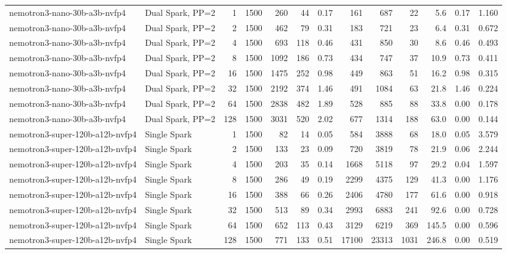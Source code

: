 \begin{tabular}{l l r r r r r r r r r r r}
nemotron3-nano-30b-a3b-nvfp4 & Dual Spark, PP=2 & 1 & 1500 & 260 & 44 & 0.17 & 161 & 687 & 22 & 5.6 & 0.17 & 1.160 \\
nemotron3-nano-30b-a3b-nvfp4 & Dual Spark, PP=2 & 2 & 1500 & 462 & 79 & 0.31 & 183 & 721 & 23 & 6.4 & 0.31 & 0.672 \\
nemotron3-nano-30b-a3b-nvfp4 & Dual Spark, PP=2 & 4 & 1500 & 693 & 118 & 0.46 & 431 & 850 & 30 & 8.6 & 0.46 & 0.493 \\
nemotron3-nano-30b-a3b-nvfp4 & Dual Spark, PP=2 & 8 & 1500 & 1092 & 186 & 0.73 & 434 & 747 & 37 & 10.9 & 0.73 & 0.411 \\
nemotron3-nano-30b-a3b-nvfp4 & Dual Spark, PP=2 & 16 & 1500 & 1475 & 252 & 0.98 & 449 & 863 & 51 & 16.2 & 0.98 & 0.315 \\
nemotron3-nano-30b-a3b-nvfp4 & Dual Spark, PP=2 & 32 & 1500 & 2192 & 374 & 1.46 & 491 & 1084 & 63 & 21.8 & 1.46 & 0.224 \\
nemotron3-nano-30b-a3b-nvfp4 & Dual Spark, PP=2 & 64 & 1500 & 2838 & 482 & 1.89 & 528 & 885 & 88 & 33.8 & 0.00 & 0.178 \\
nemotron3-nano-30b-a3b-nvfp4 & Dual Spark, PP=2 & 128 & 1500 & 3031 & 520 & 2.02 & 677 & 1314 & 188 & 63.0 & 0.00 & 0.144 \\
\addlinespace
nemotron3-super-120b-a12b-nvfp4 & Single Spark & 1 & 1500 & 82\rlap{$^\dagger$} & 14 & 0.05 & 584 & 3888 & 68 & 18.0 & 0.05 & 3.579 \\
nemotron3-super-120b-a12b-nvfp4 & Single Spark & 2 & 1500 & 133 & 23 & 0.09 & 720 & 3819 & 78 & 21.9 & 0.06 & 2.244 \\
nemotron3-super-120b-a12b-nvfp4 & Single Spark & 4 & 1500 & 203 & 35 & 0.14 & 1668 & 5118 & 97 & 29.2 & 0.04 & 1.597 \\
nemotron3-super-120b-a12b-nvfp4 & Single Spark & 8 & 1500 & 286 & 49 & 0.19 & 2299 & 4375 & 129 & 41.3 & 0.00 & 1.176 \\
nemotron3-super-120b-a12b-nvfp4 & Single Spark & 16 & 1500 & 388 & 66 & 0.26 & 2406 & 4780 & 177 & 61.6 & 0.00 & 0.918 \\
nemotron3-super-120b-a12b-nvfp4 & Single Spark & 32 & 1500 & 513 & 89 & 0.34 & 2993 & 6883 & 241 & 92.6 & 0.00 & 0.728 \\
nemotron3-super-120b-a12b-nvfp4 & Single Spark & 64 & 1500 & 652 & 113 & 0.43 & 3129 & 6219 & 369 & 145.5 & 0.00 & 0.596 \\
nemotron3-super-120b-a12b-nvfp4 & Single Spark & 128 & 1500 & 771 & 133 & 0.51 & 17100 & 23313 & 1031 & 246.8 & 0.00 & 0.519 \\

\end{tabular}
